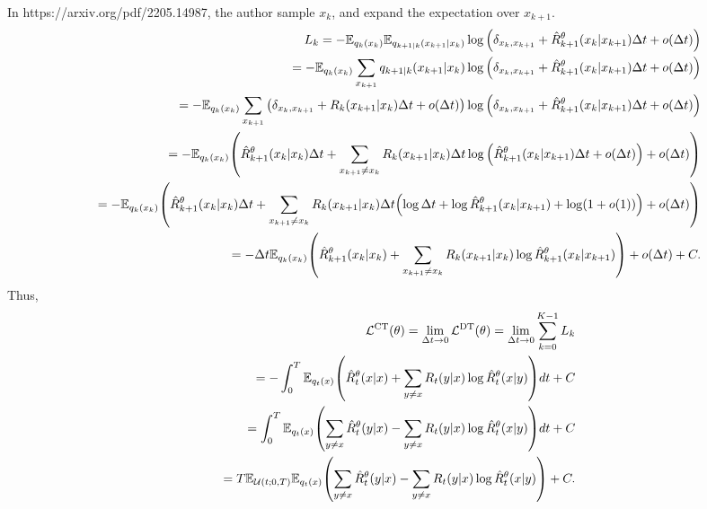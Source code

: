 \documentclass[10pt]{article}
\begin{document}
In https://arxiv.org/pdf/2205.14987, the author sample $x_k$, and expand the expectation over $x_{k+1}$.
\begin{eqnarray*}
&&L_k = -\mathbb{E}_{q_k(x_k)}\mathbb{E}_{q_{k+1|k}\qty(x_{k+1}|x_k)}\log \qty(\delta_{x_k,x_{k+1}} + \hat{R}_{k+1}^\theta\qty(x_k|x_{k+1})\Delta t + o(\Delta t)) \\
&&= -\mathbb{E}_{q_k(x_k)}\sum_{x_{k+1}}q_{k+1|k}\qty(x_{k+1}|x_k)\log \qty(\delta_{x_k,x_{k+1}} + \hat{R}_{k+1}^\theta\qty(x_k|x_{k+1})\Delta t + o(\Delta t)) \\
&&= -\mathbb{E}_{q_k(x_k)}\sum_{x_{k+1}}\qty(\delta_{x_k,x_{k+1}} + R_k\qty(x_{k+1}|x_k)\Delta t + o(\Delta t))\log \qty(\delta_{x_k,x_{k+1}} + \hat{R}_{k+1}^\theta\qty(x_k|x_{k+1})\Delta t + o(\Delta t)) \\
&&= -\mathbb{E}_{q_k(x_k)}\qty(\hat{R}_{k+1}^\theta\qty(x_k|x_k)\Delta t + \sum_{x_{k+1}\neq x_k}R_k\qty(x_{k+1}|x_k)\Delta t \log \qty(\hat{R}_{k+1}^\theta\qty(x_k|x_{k+1})\Delta t + o(\Delta t)) + o(\Delta t)) \\
&&= -\mathbb{E}_{q_k(x_k)}\qty(\hat{R}_{k+1}^\theta\qty(x_k|x_k)\Delta t + \sum_{x_{k+1}\neq x_k}R_k\qty(x_{k+1}|x_k)\Delta t \qty(\log\Delta t + \log \hat{R}_{k+1}^\theta\qty(x_k|x_{k+1}) + \log(1 + o(1))) + o(\Delta t)) \\
&&= -\Delta t\mathbb{E}_{q_k(x_k)}\qty(\hat{R}_{k+1}^\theta\qty(x_k|x_k) + \sum_{x_{k+1}\neq x_k}R_k\qty(x_{k+1}|x_k) \log \hat{R}_{k+1}^\theta\qty(x_k|x_{k+1})) + o(\Delta t) + C.
\end{eqnarray*}
Thus,
\begin{eqnarray*}
  &&\mathcal{L}^\text{CT}(\theta) = \lim_{\Delta t\to 0}\mathcal{L}^\text{DT}(\theta) = \lim_{\Delta t\to 0}\sum_{k=0}^{K-1}L_k \\
  &&= - \int_0^T \mathbb{E}_{q_t(x)}\qty(\hat{R}_t^\theta(x|x) + \sum_{y\neq x}R_t(y|x)\log\hat{R}_t^\theta(x|y))dt + C\\
  &&=\int_0^T \mathbb{E}_{q_t(x)}\qty(\sum_{y\neq x}\hat{R}_t^\theta(y|x) - \sum_{y\neq x}R_t(y|x)\log\hat{R}_t^\theta(x|y))dt + C\\
  &&=T\mathbb{E}_{\mathcal{U}(t;0,T)}\mathbb{E}_{q_t(x)}\qty(\sum_{y\neq x}\hat{R}_t^\theta(y|x) - \sum_{y\neq x}R_t(y|x)\log\hat{R}_t^\theta(x|y)) + C.
\end{eqnarray*}
\end{document}

